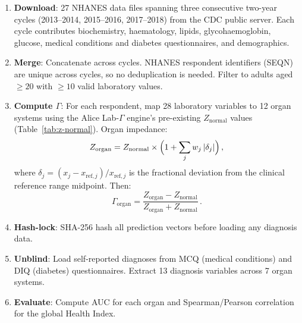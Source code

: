 \documentclass[aps,pre,twocolumn,superscriptaddress,floatfix]{revtex4-2}
\begin{document}
\begin{enumerate}
  \item \textbf{Download}: 27 NHANES data files spanning three
    consecutive two-year cycles (2013--2014, 2015--2016, 2017--2018)
    from the CDC public server.  Each cycle contributes
    biochemistry, haematology, lipids, glycohaemoglobin,
    glucose, medical conditions and diabetes questionnaires,
    and demographics.
  \item \textbf{Merge}: Concatenate across cycles.  NHANES
    respondent identifiers (SEQN) are unique across cycles,
    so no deduplication is needed.
    Filter to adults aged $\geq 20$ with $\geq 10$ valid
    laboratory values.
  \item \textbf{Compute $\Gamma$}: For each respondent,
    map 28 laboratory variables to 12 organ systems using
    the Alice Lab-$\Gamma$ engine's pre-existing
    $Z_{\text{normal}}$ values (Table~\ref{tab:z-normal}).
    Organ impedance:
    \begin{equation}
      Z_{\text{organ}} = Z_{\text{normal}}
      \times \Bigl(1 + \sum_j w_j\,|\delta_j|\Bigr)\,,
      \label{eq:z-organ}
    \end{equation}
    where $\delta_j = (x_j - x_{\text{ref},j})/x_{\text{ref},j}$
    is the fractional deviation from the clinical reference
    range midpoint.  Then:
    \begin{equation}
      \Gamma_{\text{organ}}
      = \frac{Z_{\text{organ}} - Z_{\text{normal}}}
             {Z_{\text{organ}} + Z_{\text{normal}}}\,.
      \label{eq:gamma-organ}
    \end{equation}
  \item \textbf{Hash-lock}: SHA-256 hash all prediction
    vectors before loading any diagnosis data.
  \item \textbf{Unblind}: Load self-reported diagnoses from
    MCQ (medical conditions) and DIQ (diabetes) questionnaires.
    Extract 13 diagnosis variables across 7 organ systems.
  \item \textbf{Evaluate}: Compute AUC for each organ and
    Spearman/Pearson correlation for the global Health Index.
\end{enumerate}
\end{document}
